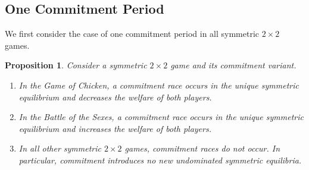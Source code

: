 \documentclass[letterpaper]{article}
\newtheorem{proposition}[theorem]{Proposition}
\theoremstyle{definition}
\begin{document}

\subsection{One Commitment Period}\label{sec:one-commitment-period}

We first consider the case of one commitment period in all symmetric $2\times2$ games.

\begin{proposition}\label{theo:GamePayoffs}
Consider a symmetric $2\times2$ game and its commitment variant.
\begin{enumerate}
    \item In the Game of Chicken, a commitment race occurs in the unique symmetric equilibrium and decreases the welfare of both players.
    \item In the Battle of the Sexes, a commitment race occurs in the unique symmetric equilibrium and increases the welfare of both players.
    \item In all other symmetric $2\times2$ games, commitment races do not occur. In particular, commitment introduces no new undominated symmetric equilibria.
\end{enumerate}
\end{proposition}
\end{document}
